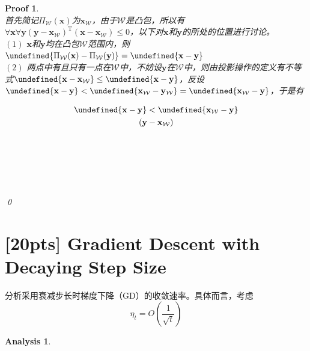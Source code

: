 \documentclass[a4paper,UTF8]{article}
\let\norm\undefined %
\DeclarePairedDelimiter\norm{\lVert}{\rVert}
\numberwithin{equation}{section}
\newtheorem*{myAnalysis}{Analysis}
\newtheorem*{myProof}{Proof}
\begin{document}
\begin{myProof}~\\
首先简记$\Pi_{\mathcal{W}}(\mathbf{x})$为$\mathbf{x}_\mathcal{W}$，由于$\mathcal{W}$是凸包，所以有$\forall \mathbf{x} \forall \mathbf{y}  (\mathbf{y} - \mathbf{x}_\mathcal{W})^\mathrm{T}(\mathbf{x}-\mathbf{x}_\mathcal{W}) \le 0 $，以下对$\mathbf{x}$和$\mathbf{y}$的所处的位置进行讨论。
~\\
$(1)$ $\mathbf{x}$和$\mathbf{y}$均在凸包$\mathcal{W}$范围内，则$\norm{\Pi_{\mathcal{W}}(\mathbf{x})-\Pi_{\mathcal{W}}(\mathbf{y})} = \norm{\mathbf{x} - \mathbf{y}}$
~\\
$(2)$ 两点中有且只有一点在$\mathcal{W}$中，不妨设$\mathbf{y}$在$\mathcal{W}$中，则由投影操作的定义有不等式$\norm{\mathbf{x} - \mathbf{x}_\mathcal{W}} \le \norm{\mathbf{x} - \mathbf{y}}$，反设$\norm{\mathbf{x} - \mathbf{y}} < \norm{\mathbf{x}_\mathcal{W} - \mathbf{y}_\mathcal{W}} = \norm{\mathbf{x}_\mathcal{W} - \mathbf{y}}$，于是有

\begin{gather}
\norm{\mathbf{x} - \mathbf{y}} < \norm{\mathbf{x}_\mathcal{W} - \mathbf{y}} \label{eq:r1} \\
(\mathbf{y}-\mathbf{x}_\mathcal{W})
\end{gather}

~\\
	~\\
	~\\
	~\\
	~\\	
	\qed
\end{myProof}

\newpage
\section{[20pts] Gradient Descent with Decaying Step Size}
\noindent 分析采用衰减步长时梯度下降（GD）的收敛速率。具体而言，考虑
\[
\eta_t=O\left(\frac{1}{\sqrt{t}}\right)
\]

\begin{myAnalysis}~\\
	~\\
	~\\
	~\\
	~\\	
	~\\
\end{myAnalysis}


\newpage
\end{document}
